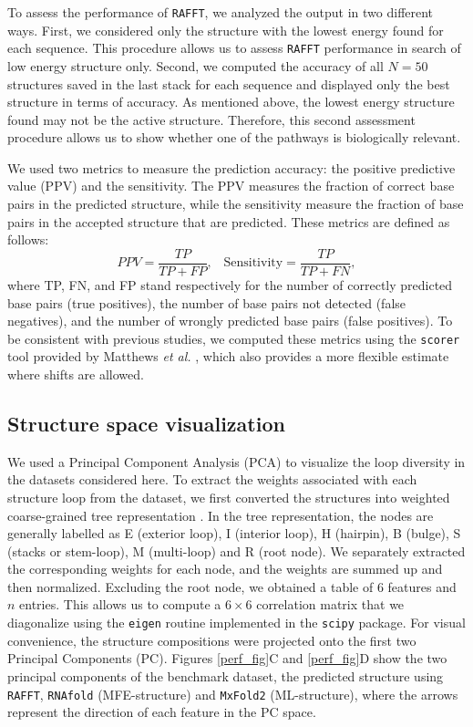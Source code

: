 To assess the performance of \texttt{RAFFT}, we analyzed the output in two different ways. First, we considered only the structure with the lowest energy found for each sequence. This procedure allows us to assess \texttt{RAFFT} performance in search of low energy structure only. Second, we computed the accuracy of all $N=50$ structures saved in the last stack for each sequence and displayed only the best structure in terms of accuracy. As mentioned above, the lowest energy structure found may not be the active structure. Therefore, this second assessment procedure allows us to show whether one of the pathways is biologically relevant.

We used two metrics to measure the prediction accuracy: the positive predictive value (PPV) and the sensitivity. The PPV measures the fraction of correct base pairs in the predicted structure, while the sensitivity measure the fraction of base pairs in the accepted structure that are predicted. These metrics are defined as follows:
\begin{equation}
PPV = \frac{TP}{TP + FP}, \;\;\; \text{Sensitivity} = \frac{TP}{TP+FN},
\end{equation}
where TP, FN, and FP stand respectively for the number of correctly predicted base pairs (true positives), the number of base pairs not detected (false negatives), and the number of wrongly predicted base pairs (false positives). To be consistent with previous studies, we computed these metrics using the \texttt{scorer} tool provided by Matthews \emph{et al.} \cite{mathews19_how_to_bench_rna_secon}, which also provides a more flexible estimate where shifts are allowed.

\subsection{Structure space visualization}

We used a Principal Component Analysis (PCA) to visualize the loop diversity in the datasets considered here. To extract the weights associated with each structure loop from the dataset, we first converted the structures into weighted coarse-grained tree representation \cite{shapiro1990comparing}. In the tree representation, the nodes are generally labelled as E (exterior loop), I (interior loop), H (hairpin), B (bulge), S (stacks or stem-loop), M (multi-loop) and R (root node). We separately extracted the corresponding weights for each node, and the weights are summed up and then normalized. Excluding the root node, we obtained a table of $6$ features and \(n\) entries. This allows us to compute a \(6\times 6\) correlation matrix that we diagonalize using the \texttt{eigen} routine implemented in the \texttt{scipy} package. For visual convenience, the structure compositions were projected onto the first two Principal Components (PC). Figures \ref{perf_fig}C and \ref{perf_fig}D show the two principal components of the benchmark dataset, the predicted structure using \texttt{RAFFT}, \texttt{RNAfold} (MFE-structure) and \texttt{MxFold2} (ML-structure), where the arrows represent the direction of each feature in the PC space.


